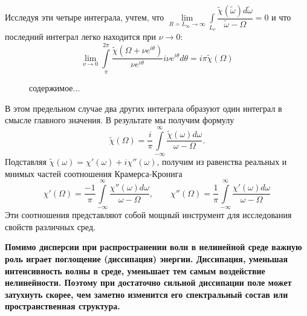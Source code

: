 \documentclass[a4paper]{article}
\begin{document}
	Исследуя эти четыре интеграла, учтем, что $\lim\limits_{R=L_{\infty}\rightarrow\infty}\int\limits_{L_{\nu}}\dfrac{\tilde{\chi}(\tilde{\omega})d\tilde{\omega}}{\tilde{\omega}-\Omega}=0$ и что последний интеграл легко находится при $\nu\rightarrow0$:
	$$\lim\limits_{\nu\rightarrow0}\int\limits_{\pi}^{2\pi}\frac{\tilde{\chi}(\Omega+\nu e^{i\theta})}{\nu e^{i\theta}}i\nu e^{i\theta}d\theta=i\pi\tilde{\chi}(\Omega)$$
	\begin{figure}[H]
		содержимое...\caption{}		
	\end{figure}
	В этом предельном случае два других интеграла образуют один интеграл в смысле главного значения. В результате мы получим формулу 
	\begin{equation}
		\tilde{\chi}(\Omega)=\frac{i}{\pi}\int\limits_{-\infty}^{\infty}\frac{\tilde{\chi}(\omega)d\omega}{\omega-\Omega}.
	\end{equation}
	Подставляя $\tilde{\chi}(\omega)=\chi'(\omega)+i\chi''(\omega)$, получим из равенства реальных и мнимых частей соотношения  Крамерса-Кронига 
	\begin{equation}
		\chi'(\Omega)=\frac{-1}{\pi}\int\limits_{-\infty}^{\infty}\frac{\chi''(\omega)d\omega}{\omega-\Omega},\qquad
		\chi''(\Omega)=\frac{1}{\pi}\int\limits_{-\infty}^{\infty}\frac{\chi'(\omega)d\omega}{\omega-\Omega}
	\end{equation}
	Эти соотношения представляют собой мощный инструмент для исследования свойств различных сред.
	
	\textbf{Помимо дисперсии при распространении волн в нелинейной среде важную роль играет поглощение (диссипация) энергии. Диссипация, уменьшая интенсивность волны в среде, уменьшает тем самым воздействие нелинейности. Поэтому при достаточно сильной диссипации поле может затухнуть скорее, чем заметно изменится его спектральный состав или пространственная структура.}
\end{document}
